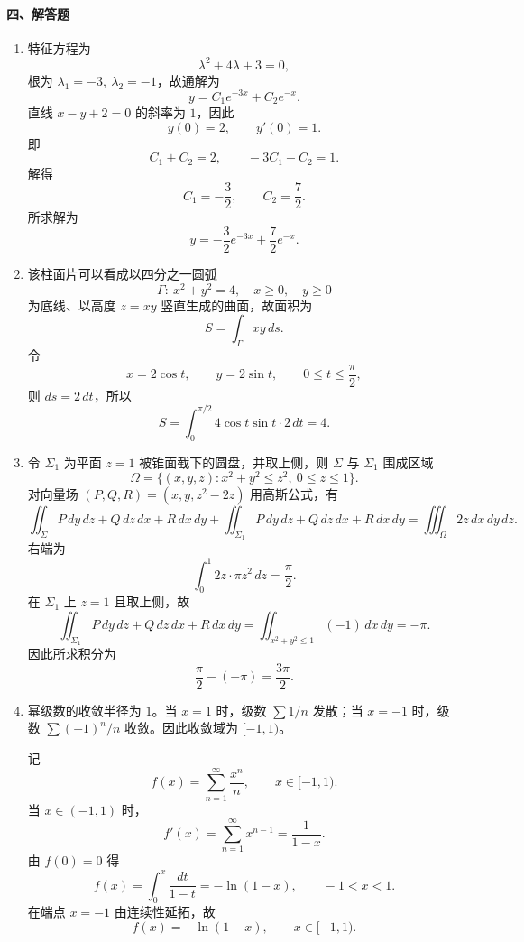 \paragraph*{四、解答题}
\begin{enumerate}
  \item 特征方程为
  \[
    \lambda^2+4\lambda+3=0,
  \]
  根为 $\lambda_1=-3,\ \lambda_2=-1$，故通解为
  \[
    y=C_1e^{-3x}+C_2e^{-x}.
  \]
  直线 $x-y+2=0$ 的斜率为 $1$，因此
  \[
    y(0)=2,\qquad y'(0)=1.
  \]
  即
  \[
    C_1+C_2=2,\qquad -3C_1-C_2=1.
  \]
  解得
  \[
    C_1=-\frac32,\qquad C_2=\frac72.
  \]
  所求解为
  \[
    y=-\frac32e^{-3x}+\frac72e^{-x}.
  \]

  \item 该柱面片可以看成以四分之一圆弧
  \[
    \Gamma:\ x^2+y^2=4,\quad x\ge0,\quad y\ge0
  \]
  为底线、以高度 $z=xy$ 竖直生成的曲面，故面积为
  \[
    S=\int_\Gamma xy\,ds.
  \]
  令
  \[
    x=2\cos t,\qquad y=2\sin t,\qquad 0\le t\le\frac{\pi}{2},
  \]
  则 $ds=2\,dt$，所以
  \[
    S=\int_0^{\pi/2}4\cos t\sin t\cdot2\,dt=4.
  \]

  \item 令 $\Sigma_1$ 为平面 $z=1$ 被锥面截下的圆盘，并取上侧，则 $\Sigma$ 与 $\Sigma_1$ 围成区域
  \[
    \Omega=\{(x,y,z):x^2+y^2\le z^2,\ 0\le z\le1\}.
  \]
  对向量场 $(P,Q,R)=(x,y,z^2-2z)$ 用高斯公式，有
  \[
    \iint_\Sigma P\,dy\,dz+Q\,dz\,dx+R\,dx\,dy
    +\iint_{\Sigma_1} P\,dy\,dz+Q\,dz\,dx+R\,dx\,dy
    =
    \iiint_\Omega 2z\,dx\,dy\,dz.
  \]
  右端为
  \[
    \int_0^1 2z\cdot \pi z^2\,dz=\frac{\pi}{2}.
  \]
  在 $\Sigma_1$ 上 $z=1$ 且取上侧，故
  \[
    \iint_{\Sigma_1} P\,dy\,dz+Q\,dz\,dx+R\,dx\,dy
    =
    \iint_{x^2+y^2\le1}(-1)\,dx\,dy=-\pi.
  \]
  因此所求积分为
  \[
    \frac{\pi}{2}-(-\pi)=\frac{3\pi}{2}.
  \]

  \item 幂级数的收敛半径为 $1$。当 $x=1$ 时，级数 $\sum 1/n$ 发散；当 $x=-1$ 时，级数
  $\sum (-1)^n/n$ 收敛。因此收敛域为 $[-1,1)$。

  记
  \[
    f(x)=\sum_{n=1}^{\infty}\frac{x^n}{n},\qquad x\in[-1,1).
  \]
  当 $x\in(-1,1)$ 时，
  \[
    f'(x)=\sum_{n=1}^{\infty}x^{n-1}=\frac1{1-x}.
  \]
  由 $f(0)=0$ 得
  \[
    f(x)=\int_0^x\frac{dt}{1-t}=-\ln(1-x),\qquad -1<x<1.
  \]
  在端点 $x=-1$ 由连续性延拓，故
  \[
    f(x)=-\ln(1-x),\qquad x\in[-1,1).
  \]
\end{enumerate}

